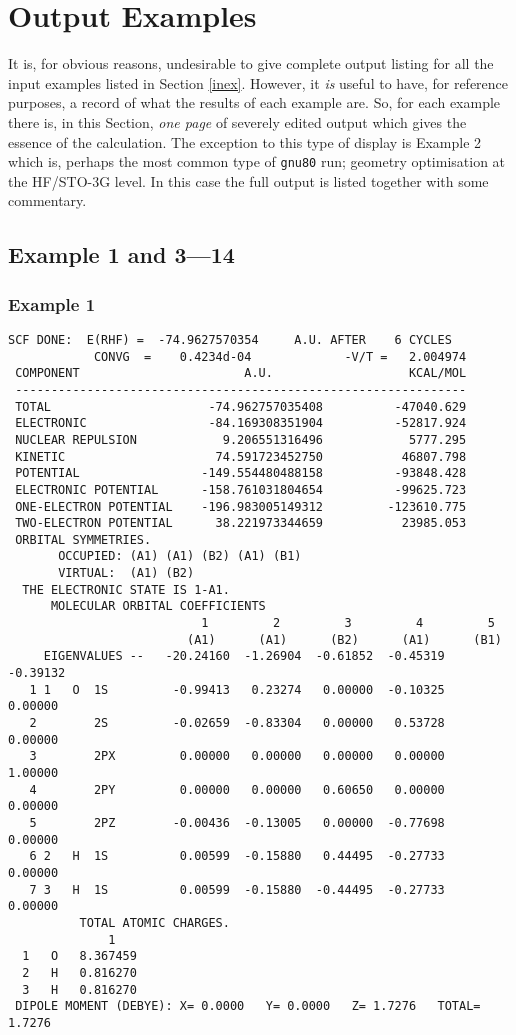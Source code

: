 \section{\sf Output Examples}
\label{outex}
It is, for obvious reasons, undesirable  to give complete
output listing for all the input examples listed in Section \ref{inex}.
However, it {\em is} useful to have, for reference purposes, a record
of what the results of each example are. So, for each example
there is, in this Section, {\em one page} of severely
edited output which gives the essence of the calculation.
The exception to this type of display is Example 2 which is, perhaps
the most common type of {\tt gnu80} run; geometry optimisation
at the HF/STO-3G level. In this case the full output is listed together
with some commentary.
\newpage
\subsection{\sf Example 1 and 3---14}
\subsubsection{\sf Example 1}
{\small
\begin{verbatim}
SCF DONE:  E(RHF) =  -74.9627570354     A.U. AFTER    6 CYCLES
            CONVG  =    0.4234d-04             -V/T =   2.004974
 COMPONENT                       A.U.                   KCAL/MOL
 ---------------------------------------------------------------
 TOTAL                      -74.962757035408          -47040.629
 ELECTRONIC                 -84.169308351904          -52817.924
 NUCLEAR REPULSION            9.206551316496            5777.295
 KINETIC                     74.591723452750           46807.798
 POTENTIAL                 -149.554480488158          -93848.428
 ELECTRONIC POTENTIAL      -158.761031804654          -99625.723
 ONE-ELECTRON POTENTIAL    -196.983005149312         -123610.775
 TWO-ELECTRON POTENTIAL      38.221973344659           23985.053
 ORBITAL SYMMETRIES.
       OCCUPIED: (A1) (A1) (B2) (A1) (B1)
       VIRTUAL:  (A1) (B2)
  THE ELECTRONIC STATE IS 1-A1.
      MOLECULAR ORBITAL COEFFICIENTS
                           1         2         3         4         5
                         (A1)      (A1)      (B2)      (A1)      (B1)
     EIGENVALUES --   -20.24160  -1.26904  -0.61852  -0.45319  -0.39132
   1 1   O  1S         -0.99413   0.23274   0.00000  -0.10325   0.00000
   2        2S         -0.02659  -0.83304   0.00000   0.53728   0.00000
   3        2PX         0.00000   0.00000   0.00000   0.00000   1.00000
   4        2PY         0.00000   0.00000   0.60650   0.00000   0.00000
   5        2PZ        -0.00436  -0.13005   0.00000  -0.77698   0.00000
   6 2   H  1S          0.00599  -0.15880   0.44495  -0.27733   0.00000
   7 3   H  1S          0.00599  -0.15880  -0.44495  -0.27733   0.00000
          TOTAL ATOMIC CHARGES.
              1
  1   O   8.367459
  2   H   0.816270
  3   H   0.816270
 DIPOLE MOMENT (DEBYE): X= 0.0000   Y= 0.0000   Z= 1.7276   TOTAL= 1.7276
\end{verbatim}
}
\newpage
